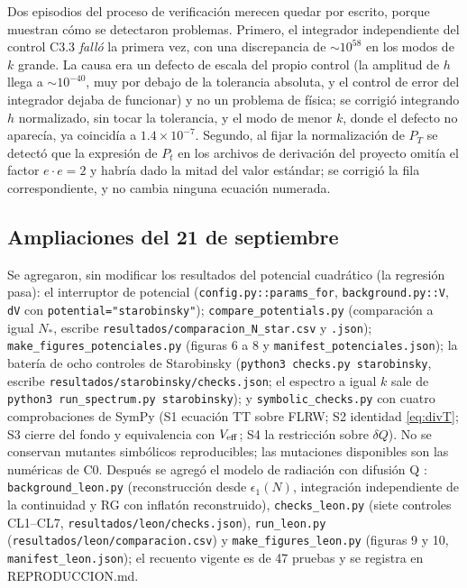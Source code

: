 Dos episodios del proceso de verificación merecen quedar por escrito, porque muestran cómo se detectaron problemas. Primero, el integrador independiente del control C3.3 \emph{falló} la primera vez, con una discrepancia de $\sim10^{58}$ en los modos de $k$ grande. La causa era un defecto de escala del propio control (la amplitud de $h$ llega a $\sim10^{-40}$, muy por debajo de la tolerancia absoluta, y el control de error del integrador dejaba de funcionar) y no un problema de física; se corrigió integrando $h$ normalizado, sin tocar la tolerancia, y el modo de menor $k$, donde el defecto no aparecía, ya coincidía a $1.4\times10^{-7}$. Segundo, al fijar la normalización de $P_T$ se detectó que la expresión de $P_t$ en los archivos de derivación del proyecto omitía el factor $e\cdot e=2$ y habría dado la mitad del valor estándar; se corrigió la fila correspondiente, y no cambia ninguna ecuación numerada.

\subsection{Ampliaciones del 21 de septiembre}

Se agregaron, sin modificar los resultados del potencial cuadrático (la regresión pasa): el interruptor de potencial (\texttt{config.py::params\_for}, \texttt{background.py::V}, \texttt{dV} con \texttt{potential="starobinsky"}); \texttt{compare\_potentials.py} (comparación a igual $N_*$, escribe \texttt{resultados/comparacion\_N\_star.csv} y \texttt{.json}); \texttt{make\_figures\_potenciales.py} (figuras 6 a 8 y \texttt{manifest\_potenciales.json}); la batería de ocho controles de Starobinsky (\texttt{python3 checks.py starobinsky}, escribe \texttt{resultados/starobinsky/checks.json}; el espectro a igual $k$ sale de \texttt{python3 run\_spectrum.py starobinsky}); y \texttt{symbolic\_checks.py} con cuatro comprobaciones de SymPy (S1 ecuación TT sobre FLRW; S2 identidad \eqref{eq:divT}; S3 cierre del fondo y equivalencia con $V_{\rm eff}$; S4 la restricción sobre $\delta Q$). No se conservan mutantes simbólicos reproducibles; las mutaciones disponibles son las numéricas de C0. Después se agregó el modelo de radiación con difusión Q \cite{leon22,piccirilli23}: \texttt{background\_leon.py} (reconstrucción desde $\epsilon_1(N)$, integración independiente de la continuidad y RG con inflatón reconstruido), \texttt{checks\_leon.py} (siete controles CL1--CL7, \texttt{resultados/leon/checks.json}), \texttt{run\_leon.py} (\texttt{resultados/leon/comparacion.csv}) y \texttt{make\_figures\_leon.py} (figuras 9 y 10, \texttt{manifest\_leon.json}); el recuento vigente es de 47 pruebas y se registra en REPRODUCCION.md.

